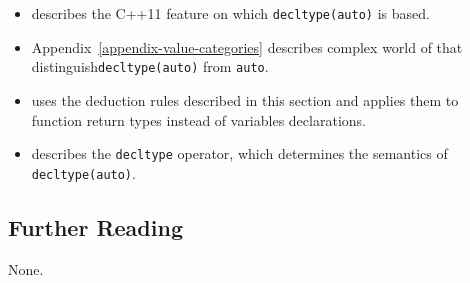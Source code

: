 \begin{itemize}
\item{describes the C++11 feature on which \lstinline!decltype(auto)! is based.}
\item{Appendix~\ref{appendix-value-categories} describes complex world of  that distinguish\linebreak[4] \lstinline!decltype(auto)! from \lstinline!auto!.}
\item{uses the deduction rules described in this section and applies them to function return types instead of variables declarations.}
\item{describes the \lstinline!decltype! operator, which determines the semantics of \lstinline!decltype(auto)!.}
\end{itemize}

\subsection[Further Reading]{Further Reading}\label{further-reading}

None.


